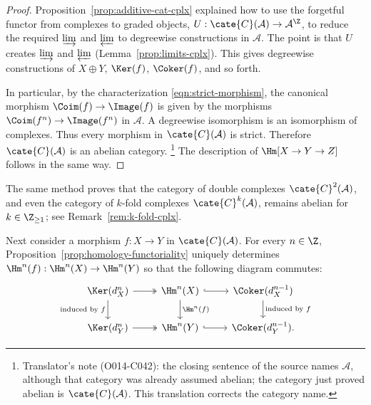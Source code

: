 \begin{proof}
	Proposition~\ref{prop:additive-cat-cplx} explained how to use the forgetful
	functor from complexes to graded objects,
	$U:\cate{C}(\mathcal{A})\to\mathcal{A}^{\Z}$, to reduce the required
	$\varinjlim$ and $\varprojlim$ to degreewise constructions in
	$\mathcal{A}$. The point is that $U$ creates $\varinjlim$ and
	$\varprojlim$ (Lemma~\ref{prop:limits-cplx}). This gives degreewise
	constructions of $X\oplus Y$, $\Ker(f)$, $\Coker(f)$, and so forth.

	In particular, by the characterization \eqref{eqn:strict-morphism}, the
	canonical morphism $\Coim(f)\to\Image(f)$ is given by the morphisms
	$\Coim(f^n)\to\Image(f^n)$ in $\mathcal{A}$. A degreewise isomorphism is
	an isomorphism of complexes. Thus every morphism in
	$\cate{C}(\mathcal{A})$ is strict. Therefore
	$\cate{C}(\mathcal{A})$ is an abelian category.%
	\footnote{Translator's note (O014-C042): the closing sentence of the
	source names $\mathcal{A}$, although that category was already assumed
	abelian; the category just proved abelian is $\cate{C}(\mathcal{A})$.
	This translation corrects the category name.} The description of
	$\Hm[X\to Y\to Z]$ follows in the same way.
\end{proof}

\begin{remark}
	The same method proves that the category of double complexes
	$\cate{C}^2(\mathcal{A})$, and even the category of $k$-fold complexes
	$\cate{C}^k(\mathcal{A})$, remains abelian for $k\in\Z_{\geq1}$; see
	Remark~\ref{rem:k-fold-cplx}.
\end{remark}

Next consider a morphism $f:X\to Y$ in $\cate{C}(\mathcal{A})$. For every
$n\in\Z$, Proposition~\ref{prop:homology-functoriality} uniquely determines
$\Hm^n(f):\Hm^n(X)\to\Hm^n(Y)$ so that the following diagram commutes:
\begin{equation}\label{eqn:induced-morphism-cohomology}\begin{tikzcd}
	\Ker(d_X^n) \arrow[twoheadrightarrow, r] \arrow[d, "\text{induced by $f$}"'] & \Hm^n(X) \arrow[hookrightarrow, r] \arrow[d, "{\Hm^n(f)}"] & \Coker(d_X^{n-1}) \arrow[d, "\text{induced by $f$}"] \\
	\Ker(d_Y^n) \arrow[twoheadrightarrow, r] & \Hm^n(Y) \arrow[hookrightarrow, r] & \Coker(d_Y^{n-1}) .
\end{tikzcd}\end{equation}

